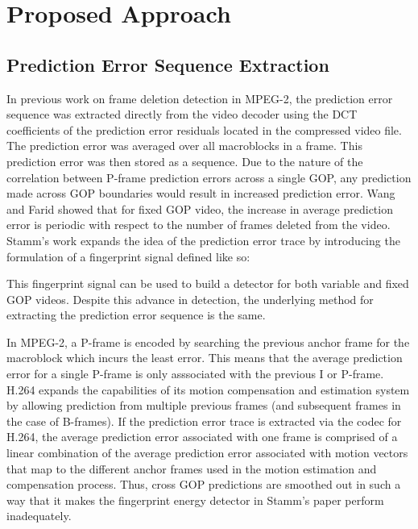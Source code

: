 \chapter{Proposed Approach}

\section{Prediction Error Sequence Extraction}

In previous work on frame deletion detection in MPEG-2, the prediction error sequence was extracted directly from the video decoder using the DCT coefficients of the prediction error residuals located in the compressed video file. The prediction error was averaged over all macroblocks in a frame. This prediction error was then stored as a sequence. Due to the nature of the correlation between P-frame prediction errors across a single GOP, any prediction made across GOP boundaries would result in increased prediction error. Wang and Farid showed that for fixed GOP video, the increase in average prediction error is periodic with respect to the number of frames deleted from the video. Stamm's work expands the idea of the prediction error trace by introducing the formulation of a fingerprint signal defined like so:


This fingerprint signal can be used to build a detector for both variable and fixed GOP videos. Despite this advance in detection, the underlying method for extracting the prediction error sequence is the same.

In MPEG-2, a P-frame is encoded by searching the previous anchor frame for the macroblock which incurs the least error. This means that the average prediction error for a single P-frame is only asssociated with the previous I or P-frame. H.264 expands the capabilities of its motion compensation and estimation system by allowing prediction from multiple previous frames (and subsequent frames in the case of B-frames). If the prediction error trace is extracted via the codec for H.264, the average prediction error associated with one frame is comprised of a linear combination of the average prediction error associated with motion vectors that map to the different anchor frames used in the motion estimation and compensation process. Thus, cross GOP predictions are smoothed out in such a way that it makes the fingerprint energy detector in Stamm's paper perform inadequately.

